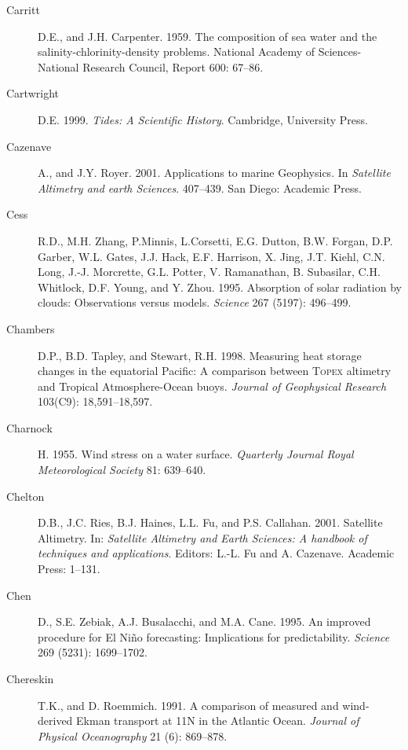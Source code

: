 \begin{description}
\item [Carritt]D.E., and J.H. Carpenter. 1959. The composition of sea
  water and the salinity-chlorinity-density problems. National Academy
  of Sciences-National Research Council, Report 600: 67--86.

\item [Cartwright]D.E. 1999. \textit{Tides: A Scientific
  History}. Cambridge, University Press.
	
\item [Cazenave]A., and J.Y. Royer. 2001. Applications to marine
  Geophysics. In \textit{Satellite Altimetry and earth
    Sciences}. 407--439. San Diego: Academic Press.

\item [Cess]R.D., M.H. Zhang, P.Minnis, L.Corsetti, E.G. Dutton,
  B.W. Forgan, D.P. Garber, W.L. Gates, J.J. Hack, E.F. Harrison,
  X. Jing, J.T. Kiehl, C.N.  Long, J.-J. Morcrette, G.L. Potter,
  V. Ramanathan, B. Subasilar, C.H. Whitlock, D.F. Young, and
  Y. Zhou. 1995. Absorption of solar radiation by clouds: Observations
  versus models. \textit{Science} 267 (5197): 496--499.

\item[Chambers]D.P., B.D. Tapley, and Stewart, R.H. 1998. Measuring
  heat storage changes in the equatorial Pacific: A comparison between
  \textsc{Topex} altimetry and Tropical Atmo\-sphere-Ocean
  buoys. \textit{Journal of Geophysical Research} 103(C9):
  18,591--18,597.

\item [Charnock]H. 1955. Wind stress on a water
  surface. \textit{Quarterly Journal Royal Meteorological Society} 81:
  639--640.

\item [Chelton]D.B., J.C. Ries, B.J. Haines, L.L. Fu, and
  P.S. Callahan. 2001. Satellite Altimetry. In: \textit{Satellite
    Altimetry and Earth Sciences: A handbook of techniques and
    applications}. Editors: L.-L. Fu and A. Cazenave. Academic Press:
  1--131.
	
\item [Chen]D., S.E. Zebiak, A.J. Busalacchi, and M.A. Cane. 1995. An
  improved procedure for El Ni\~{n}o forecasting: Implications for
  predictability.  \textit{Science} 269 (5231): 1699--1702.

\item [Chereskin]T.K., and D. Roemmich. 1991. A comparison of measured
  and wind-derived Ekman transport at 11\degrees N in the Atlantic
  Ocean.  \textit{Journal of Physical Oceanography} 21 (6): 869--878.


\end{description}
